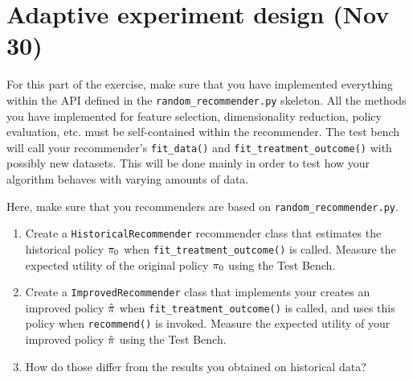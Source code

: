 \section{Adaptive experiment design (Nov 30)}
For this part of the exercise, make sure that you have implemented everything within the API defined in the \verb!random_recommender.py! skeleton. All the methods you have implemented for feature selection, dimensionality reduction, policy evaluation, etc. must be self-contained within the recommender. The test bench will call your recommender's \verb!fit_data()! and \verb!fit_treatment_outcome()! with possibly new datasets. This will be done mainly in order to test how your algorithm behaves with varying amounts of data.
\begin{exercise}
  Here, make sure that you recommenders are based on \verb!random_recommender.py!.
  \begin{enumerate}
  \item Create a \texttt{HistoricalRecommender} recommender class that estimates the historical policy $\pi_0$ when \verb!fit_treatment_outcome()! is called. Measure the expected utility of the original policy $\pi_0$ using the Test Bench.
  \item Create a \texttt{ImprovedRecommender} class that implements your creates an improved policy $\hat{\pi}$ when \verb!fit_treatment_outcome()! is called, and uses this policy when \verb!recommend()! is invoked. Measure the expected utility of your improved policy $\hat{\pi}$ using the Test Bench.
  \item How do those differ from the results you obtained on historical data?
  \end{enumerate}
\end{exercise}

